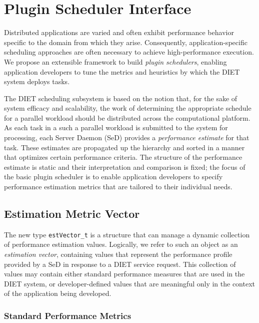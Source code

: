 \section{Plugin Scheduler Interface}

Distributed applications are varied and often exhibit performance
behavior specific to the domain from which they arise.  Consequently,
application-specific scheduling approaches are often necessary to
achieve high-performance execution.  We propose an extensible
framework to build
\emph{plugin schedulers}, enabling application developers to tune the
metrics and heuristics by which the DIET system deploys tasks.

The DIET scheduling subsystem is based on the notion that, for the
sake of system efficacy and scalability, the work of
determining the appropriate schedule for a parallel workload should be
distributed across the computational platform.  As each task in a
such a parallel workload is submitted to the system for processing,
each Server Daemon (SeD) provides a
\emph{performance estimate} for that task.  These estimates are
propagated up the hierarchy and sorted in a manner that optimizes
certain performance criteria.  The structure of the
performance estimate is static and their interpretation and comparison
is fixed; the focus of the basic plugin scheduler is to enable
application developers to specify performance estimation metrics that
are tailored to their individual needs.


\subsection{Estimation Metric Vector}\label{sect:estvector}

The new type \texttt{estVector\_t} is a structure that can manage a
dynamic collection of performance estimation values.  Logically, we
refer to such an object as an \emph{estimation vector}, containing
values that represent the performance profile provided by a
SeD in response to a DIET service request.  This collection of values
may contain either standard performance measures that are used in the
DIET system, or developer-defined values that are meaningful only in
the context of the application being developed.

\subsubsection{Standard Performance Metrics}

